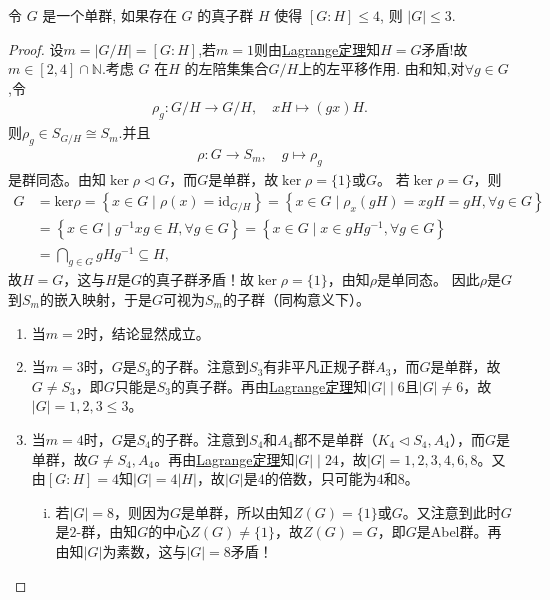 \documentclass[../../main.tex]{subfiles}%
\begin{document}
\begin{example}
令 $G$ 是一个单群, 如果存在 $G$ 的真子群 $H$ 使得 $[G:H] \leqslant 4$, 则 $|G| \leqslant 3$.
\end{example}
\begin{proof}

设$m=|G/H|=[G:H]$,若$m=1$则由\hyperref[theorem:抽象代数--Lagrange定理]{Lagrange定理}知$H=G$矛盾!故$m\in [2,4]\cap \mathbb{N}$.考虑 $G$ 在$H$ 的左陪集集合$G/H$上的左平移作用. 由和知,对$\forall g\in G$,令
\begin{align*}
\rho_g:G/H\rightarrow G/H,\quad xH\mapsto (gx)H.
\end{align*}
则$\rho_g\in S_{G/H}\cong S_m$.并且
\begin{align*}
\rho:G\rightarrow S_m,\quad g\mapsto \rho_g
\end{align*}
是群同态。由知$\ker\rho\lhd G$，而$G$是单群，故$\ker\rho=\{1\}$或$G$。
若$\ker\rho=G$，则
\begin{align*}
G&=\mathrm{ker}\rho =\left\{ x\in G\mid \rho \left( x \right) =\mathrm{id}_{G/H} \right\} =\left\{ x\in G\mid \rho _x\left( gH \right) =xgH=gH,\forall g\in G \right\} 
\\
&=\left\{ x\in G\mid g^{-1}xg\in H,\forall g\in G \right\} =\left\{ x\in G\mid x\in gHg^{-1},\forall g\in G \right\} 
\\
&=\bigcap_{g\in G}{gHg^{-1}}\subseteq H,
\end{align*}
故$H=G$，这与$H$是$G$的真子群矛盾！故$\ker\rho=\{1\}$，由知$\rho$是单同态。
因此$\rho$是$G$到$S_m$的嵌入映射，于是$G$可视为$S_m$的子群（同构意义下）。
\begin{enumerate}[(1)]
\item 当$m=2$时，结论显然成立。

\item 当$m=3$时，$G$是$S_3$的子群。注意到$S_3$有非平凡正规子群$A_3$，而$G$是单群，故$G\ne S_3$，即$G$只能是$S_3$的真子群。再由\hyperref[theorem:抽象代数--Lagrange定理]{Lagrange定理}知$|G|\mid 6$且$|G|\ne 6$，故$|G|=1,2,3\leqslant 3$。

\item 当$m=4$时，$G$是$S_4$的子群。注意到$S_4$和$A_4$都不是单群（$K_4\lhd S_4,A_4$），而$G$是单群，故$G\ne S_4,A_4$。再由\hyperref[theorem:抽象代数--Lagrange定理]{Lagrange定理}知$|G|\mid 24$，故$|G|=1,2,3,4,6,8$。又由$[G:H]=4$知$|G|=4|H|$，故$|G|$是$4$的倍数，只可能为$4$和$8$。
\begin{enumerate}[(i)]
\item 若$|G|=8$，则因为$G$是单群，所以由知$Z(G)=\{1\}$或$G$。又注意到此时$G$是$2$-群，由知$G$的中心$Z(G)\ne \{1\}$，故$Z(G)=G$，即$G$是Abel群。再由知$|G|$为素数，这与$|G|=8$矛盾！


\end{enumerate}
\end{enumerate}
\end{proof}
\end{document}
